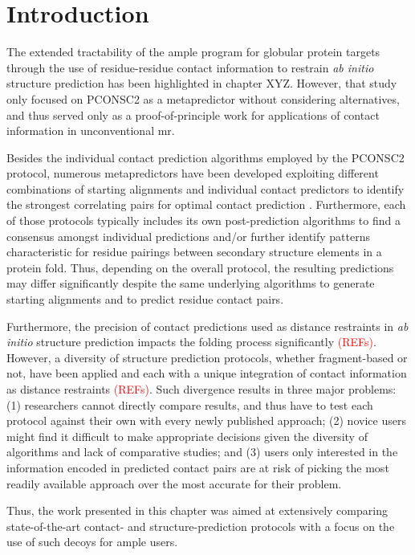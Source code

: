 \section{Introduction}
The extended tractability of the \gls{ample} program for globular protein targets through the use of residue-residue contact information to restrain \textit{ab initio} structure prediction has been highlighted in chapter XYZ. However, that study only focused on PCONSC2 as a metapredictor without considering alternatives, and thus served only as a proof-of-principle work for applications of contact information in unconventional \gls{mr}.

Besides the individual contact prediction algorithms employed by the PCONSC2 protocol, numerous metapredictors have been developed exploiting different combinations of starting alignments and individual contact predictors to identify the strongest correlating pairs for optimal contact prediction \cite{Kamisetty2013-bs, Skwark2014-mu, Jones2015-wp, Ma2015-qd, He2017-if, Michel2017-lh, Wang2017-ox}. Furthermore, each of those protocols typically includes its own post-prediction algorithms to find a consensus amongst individual predictions and/or further identify patterns characteristic for residue pairings between secondary structure elements in a protein fold. Thus, depending on the overall protocol, the resulting predictions may differ significantly despite the same underlying algorithms to generate starting alignments and to predict residue contact pairs.

Furthermore, the precision of contact predictions used as distance restraints in \textit{ab initio} structure prediction impacts the folding process significantly \textcolor{red}{(REFs)}. However, a diversity of structure prediction protocols, whether fragment-based or not, have been applied and each with a unique integration of contact information as distance restraints \textcolor{red}{(REFs)}. Such divergence results in three major problems: (1) researchers cannot directly compare results, and thus have to test each protocol against their own with every newly published approach; (2) novice users might find it difficult to make appropriate decisions given the diversity of algorithms and lack of comparative studies; and (3) users only interested in the information encoded in predicted contact pairs are at risk of picking the most readily available approach over the most accurate for their problem.

Thus, the work presented in this chapter was aimed at extensively comparing state-of-the-art contact- and structure-prediction protocols with a focus on the use of such decoys for \gls{ample} users.


